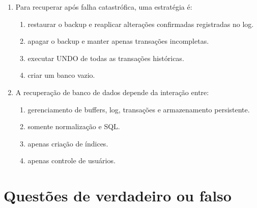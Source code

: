 \documentclass[12pt,a4paper]{article}
\begin{document}
\begin{enumerate}[label=\textbf{Q\arabic*.}]
\item Para recuperar após falha catastrófica, uma estratégia é:

\begin{enumerate}[label=\alph*)]
    \item restaurar o backup e reaplicar alterações confirmadas registradas no log.
    \item apagar o backup e manter apenas transações incompletas.
    \item executar UNDO de todas as transações históricas.
    \item criar um banco vazio.
\end{enumerate}

\item A recuperação de banco de dados depende da interação entre:

\begin{enumerate}[label=\alph*)]
    \item gerenciamento de buffers, log, transações e armazenamento persistente.
    \item somente normalização e SQL.
    \item apenas criação de índices.
    \item apenas controle de usuários.
\end{enumerate}

\end{enumerate}

\section{Questões de verdadeiro ou falso}
\end{document}
